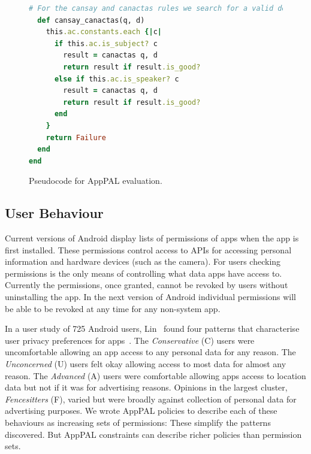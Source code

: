 \documentclass{scrartcl}
\begin{document}
\begin{figure}
\begin{minipage}{0.5\linewidth}
\begin{lstlisting}[language=Ruby,basicstyle=\footnotesize\ttfamily]
  # For the cansay and canactas rules we search for a valid delagator (cansay) or role (canactas) that can replace the subject of the query.  The AC is preprocessed to find potential speakers (constants who say something) and subjects (constants about which something is said) to avoid unnecessary searches.
  def cansay_canactas(q, d)
    this.ac.constants.each {|c|
      if this.ac.is_subject? c
        result = canactas q, d
        return result if result.is_good?
      else if this.ac.is_speaker? c
        result = canactas q, d
        return result if result.is_good?
      end
    }
    return Failure
  end
end
\end{lstlisting}
\end{minipage}
\caption{Pseudocode for AppPAL evaluation.}
\label{lst:eval}
\end{figure}

\subsection{User Behaviour}

Current versions of Android display lists of permissions of apps when the app is first installed.
These permissions control access to APIs for accessing personal information and hardware devices (such as the camera).
For users checking permissions is the only means of controlling what data apps have access to.
Currently the permissions, once granted, cannot be revoked by users without uninstalling the app.
In the next version of Android individual permissions will be able to be revoked at any time for any non-system app.

In a user study of 725 Android users, Lin~\etal{} found four patterns that characterise user privacy preferences for apps~\citep{Sadeh:2014vq}.
The \emph{Conservative} (C) users were uncomfortable allowing an app access to any personal data for any reason.
The \emph{Unconcerned} (U) users felt okay allowing access to most data for almost any reason.
The \emph{Advanced} (A) users were comfortable allowing apps access to location data but not if it was for advertising reasons.
Opinions in the largest cluster, \emph{Fencesitters} (F), varied but were broadly against collection of personal data for advertising purposes.
We wrote AppPAL policies to describe each of these behaviours as increasing sets of permissions:
These simplify the patterns discovered. %
But AppPAL constraints can describe richer policies than permission sets.
\end{document}
